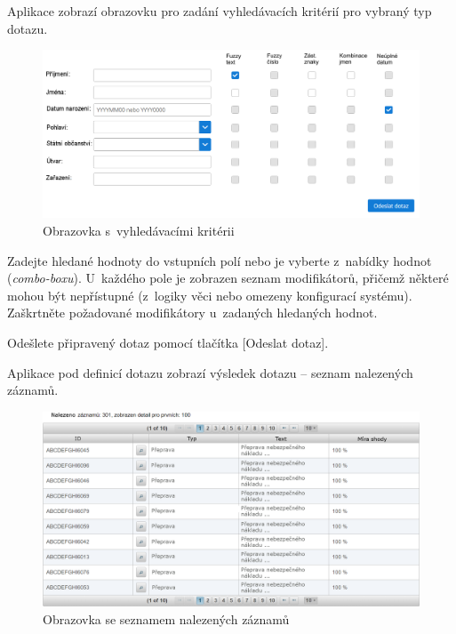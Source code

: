 \documentclass[thesis=M,czech]{FITthesis}[2019/12/23]
\begin{document}
Aplikace zobrazí obrazovku pro zadání vyhledávacích kritérií pro vybraný typ dotazu.

\begin{figure}[H]
  \centering
  \includegraphics[width=\textwidth]{res/guide/SearchCriteria.png}
  \caption{Obrazovka s~vyhledávacími kritérii}
  \label{fig:ObrazovkaSVyhledavacimiKriterii}
\end{figure}

Zadejte hledané hodnoty do vstupních polí nebo je vyberte z~nabídky hodnot (\textit{combo-boxu}). U~každého pole je zobrazen seznam modifikátorů, přičemž některé mohou být nepřístupné (z~logiky věci nebo omezeny konfigurací systému). Zaškrtněte požadované modifikátory u~zadaných hledaných hodnot.

Odešlete připravený dotaz pomocí tlačítka [Odeslat dotaz].

Aplikace pod definicí dotazu zobrazí výsledek dotazu – seznam nalezených záznamů.

\begin{figure}[H]
  \centering
  \includegraphics[width=\textwidth]{res/guide/ResponseData.png}
  \caption{Obrazovka se seznamem nalezených záznamů}
  \label{fig:Obrazovka se seznamem nalezených záznamů}
\end{figure}
\end{document}
